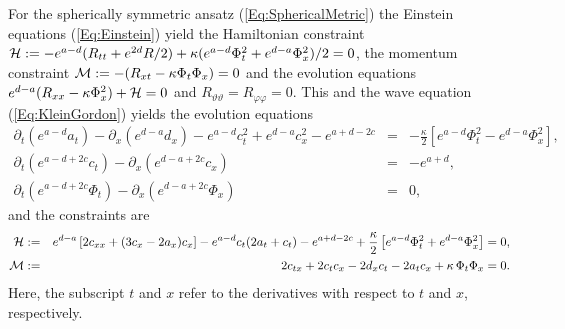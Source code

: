 \documentclass[           %
               showpacs,            %
               preprintnumbers,     %
               aps,                 %
               prd,                 %
               superscriptaddress,      %
               nofootinbib,         %
               tightenlines,        %
               floats,floatfix      %
               ]{revtex4}
\begin{document}
For the spherically symmetric ansatz (\ref{Eq:SphericalMetric}) the
Einstein equations (\ref{Eq:Einstein}) yield the Hamiltonian
constraint ${\cal H} := -e^{a-d}( R_{tt} + e^{2d} R/2) +
\kappa(e^{a-d}\Phi_t^2 + e^{d-a}\Phi_x^2)/2 = 0$, the momentum
constraint ${\cal M} := -(R_{xt} - \kappa\Phi_t\Phi_x) = 0$ and the
evolution equations $e^{d-a}( R_{xx} - \kappa\Phi_x^2 ) + {\cal H} =
0$ and $R_{\vartheta\vartheta} = R_{\varphi\varphi} = 0$. This and the
wave equation (\ref{Eq:KleinGordon}) yields the evolution equations
\begin{eqnarray}
\partial_t\left( e^{a-d} a_t \right) - \partial_x\left( e^{d-a} d_x \right)
 - e^{a-d} c_t^2 + e^{d-a} c_x^2 - e^{a+d-2c} 
 &=& -\frac{\kappa}{2}\left[ e^{a-d}\Phi_t^2 - e^{d-a}\Phi_x^2 \right],
\label{Eq:Ev1}\\
\partial_t\left( e^{a-d+2c} c_t \right) 
 - \partial_x\left( e^{d-a+2c} c_x \right) &=& -e^{a+d},
\label{Eq:Ev2}\\
\partial_t\left( e^{a-d+2c} \Phi_t \right) 
 - \partial_x\left( e^{d-a+2c} \Phi_x \right) &=& 0,
\label{Eq:Ev3}
\end{eqnarray}
and the constraints are
\begin{eqnarray}
{\cal H} &:=& e^{d-a}\left[ 2c_{xx} + (3c_x - 2a_x)c_x \right] 
 - e^{a-d} c_t(2a_t + c_t) - e^{a+d-2c}
 + \frac{\kappa}{2}\left[ e^{a-d}\Phi_t^2 + e^{d-a} \Phi_x^2 \right] = 0,\\
{\cal M} &:=& 2c_{tx} + 2c_t c_x - 2d_x c_t - 2a_t c_x 
 + \kappa\, \Phi_t \Phi_x = 0.
\end{eqnarray}
Here, the subscript $t$ and $x$ refer to the derivatives with respect
to $t$ and $x$, respectively.
\end{document}
